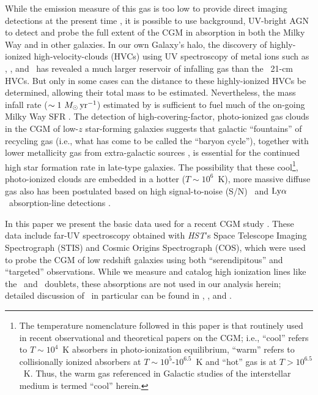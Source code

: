 \documentclass[twocolumn,twocolappendix,tighten,times]{aastex6}
\newcommand{\HI}{\ion{H}{1}}
\newcommand{\CIV}{\ion{C}{4}}
\newcommand{\NV}{\ion{N}{5}}
\newcommand{\OVI}{\ion{O}{6}}
\newcommand{\SiIII}{\ion{Si}{3}}
\newcommand{\hst}{{\sl HST}}
\newcommand{\lya}{\ensuremath{{\rm Ly}\alpha}}
\begin{document}
While the emission measure of this gas is too low to provide
direct imaging detections at the present time 
\citep*[although see][]{donahue95,martin15,fumagalli17},
it is possible to use background, UV-bright AGN to detect and probe
the full extent of the CGM in absorption in both the Milky Way and in other 
galaxies. In our own Galaxy's halo, the discovery of
highly-ionized high-velocity-clouds (HVCs) \citep*{sembach95, 
sembach03, collins04} using UV spectroscopy of metal ions such as \SiIII, 
\CIV, and \OVI\ has revealed a much larger reservoir of infalling gas 
\citep*{shull09, collins09} than the \HI\ 21-cm HVCs. But
only in some cases \citep{lehner11} can the distance to these
highly-ionized HVCs be determined, allowing their total mass to be
estimated. Nevertheless, the mass infall rate 
($\sim1~M_{\odot}\,{\rm yr}^{-1}$) estimated by \citet{shull09} is sufficient 
to fuel much of the on-going Milky Way SFR 
\citep[2-$4~M_{\odot}\,{\rm yr}^{-1}$;][]{diehl06, robitaille10, shull11}. 
The detection of high-covering-factor, photo-ionized gas clouds in the 
CGM of low-$z$ star-forming galaxies \citep{werk14, stocke13}
suggests that galactic ``fountains'' of recycling gas (i.e.,
what has come to be called the ``baryon cycle''), together with lower
metallicity gas from extra-galactic sources \citep[e.g., dwarf galaxy 
satellites;][or the Inter-Galactic Medium; IGM; \citealp{bowen16}]{stocke13},
is essential for the continued high star formation rate in late-type
galaxies. The possibility that these cool\footnote{The temperature nomenclature
followed in this paper is that routinely used in recent observational and 
theoretical papers on the CGM; i.e., ``cool'' refers to $T\sim10^4$~K absorbers
in photo-ionization equilibrium, ``warm'' refers to collisionally ionized absorbers
at $T\sim10^5$-$10^{6.5}$~K and ``hot'' gas is at $T>10^{6.5}$~K. Thus, the 
warm gas referenced in Galactic studies of the interstellar medium is termed 
``cool'' herein.}, photo-ionized clouds are embedded in a hotter ($T\sim10^6$~K), 
more massive diffuse gas also has been postulated based on high signal-to-noise 
(S/N) \OVI\ and \lya\ absorption-line detections \citep{stocke14, pachat16}.

In this paper we present the basic data used for a recent CGM study
\citep[][Paper~1 hereafter]{stocke13}. These data include far-UV spectroscopy
obtained with \hst's Space Telescope Imaging Spectrograph (STIS) and
Cosmic Origins Spectrograph (COS), which were used to probe the CGM of low
redshift galaxies using both ``serendipitous'' and ``targeted''
observations.  While we measure and catalog high ionization lines like the \NV\ 
and \OVI\ doublets, these absorptions are not used in our analysis herein; 
detailed discussion of \OVI\ in particular can be found in \citet{savage14}, 
\citet{stocke14}, and \citet{werk16}.
\end{document}
